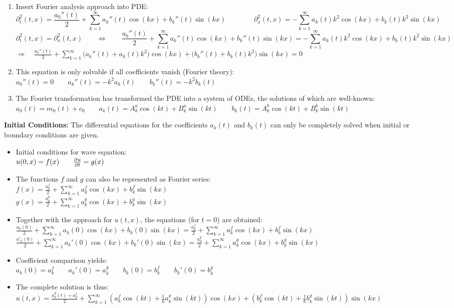 \begin{enumerate}
\item Insert Fourier analysis approach into PDE:\\
$$\partial_t^2(t,x)=\frac{a_0''(t)}{2}+\sum\limits_{k=1}^{\infty}{a_k''(t)\cos(kx)+b_k''(t)\sin(kx)}
\qquad \qquad
\partial_x^2(t,x)=-\sum\limits_{k=1}^{\infty}{a_k(t)k^2\cos(kx)+b_k(t)k^2\sin(kx)}$$
$$\partial_t^2(t,x)=\partial_x^2(t,x)
\qquad \Longleftrightarrow \qquad \frac{a_0''(t)}{2}+\sum\limits_{k=1}^{\infty}{a_k''(t)\cos(kx)+b_k''(t)\sin(kx)}=-\sum\limits_{k=1}^{\infty}{a_k(t)k^2\cos(kx)+b_k(t)k^2\sin(kx)}$$
$\boxed{\Rightarrow\quad \frac{a_0''(t)}{2}+\sum\limits_{k=1}^{\infty}{\big(a_k''(t)+a_k(t)k^2\big)\cos(kx)+\big(b_k''(t)+b_k(t)k^2\big)\sin(kx)}=0}$
\item This equation is only solvable if all coefficients vanish (Fourier theory):\\[0.2cm]
$a_0''(t)=0 \qquad a_k''(t)=-k^2a_k(t)\qquad b_k''(t)=-k^2b_k(t)$
\item The Fourier transformation has transformed the PDE into a system of ODEs, the solutions of which are well-known:\\[0.2cm]
$a_0(t)=m_0(t)+c_0\qquad a_k(t)=A_k^a\cos(kt)+B_k^a\sin(kt)\qquad b_k(t)=A_k^b\cos(kt)+B_k^b\sin(kt)$
\end{enumerate}

\textbf{Initial Conditions:}
The differential equations for the coefficients $a_k(t)$ and $b_k(t)$ can only be completely solved when initial or boundary conditions are given.
\begin{itemize}
\item Initial conditions for wave equation:\\
\quad $u(0,x)=f(x)\qquad \frac{\partial u}{\partial t}=g(x)$
\item The functions $f$ and $g$ can also be represented as Fourier series:\\
$f(x)=\frac{a_0^f}{2}+\sum\limits_{k=1}^{\infty}{a^f_k\cos(kx)+b^f_k\sin(kx)}$\\[0.2cm]
$g(x)=\frac{a_0^g}{2}+\sum\limits_{k=1}^{\infty}{a^g_k\cos(kx)+b^g_k\sin(kx)}$
\item Together with the approach for $u(t,x)$, the equations (for $t=0$) are obtained:\\
$\frac{a_0(0)}{2}+\sum\limits_{k=1}^{\infty}{a_k(0)\cos(kx)+b_k(0)\sin(kx)}=\frac{a_0^f}{2}+\sum\limits_{k=1}^{\infty}{a_k^f\cos(kx)+b^f_k\sin(kx)}$\\[0.2cm]
$\frac{a'_0(0)}{2}+\sum\limits_{k=1}^{\infty}{a_k'(0)\cos(kx)+b_k'(0)\sin(kx)}=\frac{a_0^g}{2}+\sum\limits_{k=1}^{\infty}{a_k^g\cos(kx)+b^g_k\sin(kx)}$
\item Coefficient comparison yields:\\
$a_k(0)=a_k^f\qquad a_k'(0)=a_k^g\qquad b_k(0)=b_k^f\qquad b_k'(0)=b_k^g$
\item The complete solution is thus:\\
$u(t,x)=\frac{a_0^g(t)+a_0^f}2+\sum\limits_{k=1}^{\infty}{\left(a_k^f\cos(kt)+\frac 1k a_k^g\sin(kt)\right)\cos(kx)+\left(b_k^f\cos(kt)+\frac 1k b_k^g\sin(kt)\right)}\sin(kx)$
\end{itemize}

